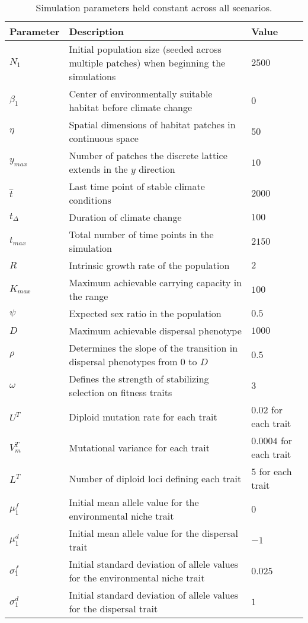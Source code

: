 \documentclass[12pt, oneside]{article}
\begin{document}
\begin{table}
\renewcommand{\arraystretch}{1.5}
  \begin{tabular}{ p{2cm} | p{8cm} | p{2cm} }
    \hline
    Parameter & Description & Value \\ \hline \hline
    $N_{1}$ & Initial population size (seeded across multiple patches) when beginning the simulations & $2500$ \\
    $\beta_{1}$ & Center of environmentally suitable habitat before climate change & $0$ \\
    $\eta$ & Spatial dimensions of habitat patches in continuous space & $50$ \\
    $y_{max}$ & Number of patches the discrete lattice extends in the $y$ direction & $10$ \\
    $\hat{t}$ & Last time point of stable climate conditions & $2000$ \\
    $t_{\Delta}$ & Duration of climate change & $100$ \\
    $t_{max}$ & Total number of time points in the simulation & $2150$ \\
    $R$ & Intrinsic growth rate of the population & $2$ \\
    $K_{max}$ & Maximum achievable carrying capacity in the range & $100$ \\ 
    $\psi$ & Expected sex ratio in the population & $0.5$ \\
    $D$ & Maximum achievable dispersal phenotype & $1000$ \\
    $\rho$ & Determines the slope of the transition in dispersal phenotypes from $0$ to $D$ & $0.5$ \\
    $\omega$ & Defines the strength of stabilizing selection on fitness traits & $3$ \\
    $U^{T}$ & Diploid mutation rate for each trait & $0.02$ for each trait \\
    $V_{m}^{T}$ & Mutational variance for each trait & $0.0004$ for each trait \\
    $L^{T}$ & Number of diploid loci defining each trait & $5$ for each trait \\
    $\mu_{1}^{f}$ & Initial mean allele value for the environmental niche trait & $0$ \\
    $\mu_{1}^{d}$ & Initial mean allele value for the dispersal trait & $-1$ \\
    $\sigma_{1}^{f}$ & Initial standard deviation of allele values for the environmental niche trait & $0.025$ \\
    $\sigma_{1}^{d}$ & Initial standard deviation of allele values for the dispersal trait & $1$ \\
    \hline
  \end{tabular}
\caption[LoF entry]{Simulation parameters held constant across all scenarios.}
\label{table:ConstPars}
\end{table}
\end{document}
